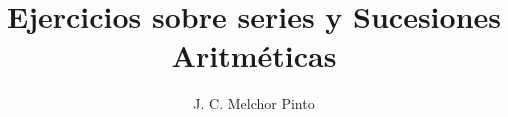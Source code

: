 \documentclass[12pt]{guia}
\title{Ejercicios sobre series y Sucesiones Aritméticas}
\author{J. C. Melchor Pinto}
\begin{document}
\pagestyle{headandfoot}
\addpoints
\INFO
\printanswers
\begin{questions}
    
    
    
    
    
    
    
    
    
    
    
    
    
    
    
    
\end{questions}

\end{document}
